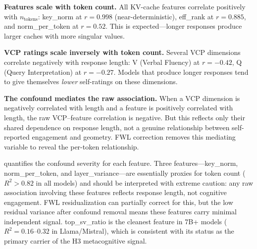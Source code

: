 \documentclass[11pt,a4paper]{article}
\begin{document}
\textbf{Features scale with token count.} All KV-cache features correlate positively with $n_{\text{tokens}}$: key\_norm at $r = 0.998$ (near-deterministic), eff\_rank at $r = 0.885$, and norm\_per\_token at $r = 0.52$. This is expected---longer responses produce larger caches with more singular values.

\textbf{VCP ratings scale inversely with token count.} Several VCP dimensions correlate negatively with response length: V (Verbal Fluency) at $r = -0.42$, Q (Query Interpretation) at $r = -0.27$. Models that produce longer responses tend to give themselves \emph{lower} self-ratings on these dimensions.

\textbf{The confound mediates the raw association.} When a VCP dimension is negatively correlated with length and a feature is positively correlated with length, the raw VCP--feature correlation is negative. But this reflects only their shared dependence on response length, not a genuine relationship between self-reported engagement and geometry. FWL correction removes this mediating variable to reveal the per-token relationship.

 quantifies the confound severity for each feature. Three features---key\_norm, norm\_per\_token, and layer\_variance---are essentially proxies for token count ($R^2 > 0.82$ in all models) and should be interpreted with extreme caution: any raw association involving these features reflects response length, not cognitive engagement. FWL residualization can partially correct for this, but the low residual variance after confound removal means these features carry minimal independent signal. top\_sv\_ratio is the cleanest feature in 7B+ models ($R^2 = 0.16$--$0.32$ in Llama/Mistral), which is consistent with its status as the primary carrier of the H3 metacognitive signal.
\end{document}
